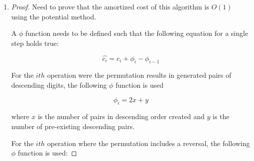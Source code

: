\documentclass[11pt]{article}
\begin{document}
\begin{enumerate}
\begin{proof}
To start, let's define the operations that need to be payed for. Every function call requires finding the $pivot$ and $swap$, swapping both values, and reversing the sequence after the $pivot$. To find the $pivot$, the cost is $x$, where $x$ is the number of iterations needed to find the $pivot$. To find the $swap$, the cost is $x-1$. To do the swap is contant time of 1. Reversing the sequence after the $pivot$ costs $\lfloor\frac{x}{2}\rfloor$. So for each step, the cost is $x +$ $(x-1) +$ $\lfloor\frac{x}{2}\rfloor + 1$. Take the example of a sequence of length 4, represented by $n$, and the number of permutations is $k = n!$. For $k$ permutations, the actual cost was 143. To get the amount that needs to be invested each permutation, the following equation needs to hold true:

$$
\sum_{i=1}^{k}\hat{c_i} \geq \sum_{i=1}^{k}c_i
$$

Given this equation, the only $\hat{c}$ that can satisfy this is 6 because $6k = 144$. With this, each permutation gets an investment of $\$6$ every time a $pivot$ is found. \$x is paid to find the pivot and $\$(x-1)$ is paid to find the $swap$ and $\$1$ is paid to do the swap. $\$\lfloor\frac{x}{2}\rfloor$ is paid to reverse the sequence after the $pivot$. There will be instances where an investment will not cover the cost of a function call. In this instance, borrowing credit will need to happen. The amortized cost, then, is $\Theta(6k) / k = \Theta(6) = \Theta(1)$.

\end{proof}

\newpage

\item

\begin{proof}
Need to prove that the amortized cost of this algorithm is $O(1)$ using the potential method.

A $\phi$ function needs to be defined such that the following equation for a single step holds true:

$$
\hat{c_i} = c_i + \phi_i - \phi_{i-1}
$$

For the $ith$ operation were the permutation results in generated pairs of descending digits, the following $\phi$ function is used

$$
\phi_i = 2x + y
$$

where $x$ is the number of pairs in descending order created and $y$ is the number of pre-existing descending pairs.

For the $ith$ operation where the permutation includes a reversal, the following $\phi$ function is used:


\end{proof}
\end{enumerate}
\end{document}

